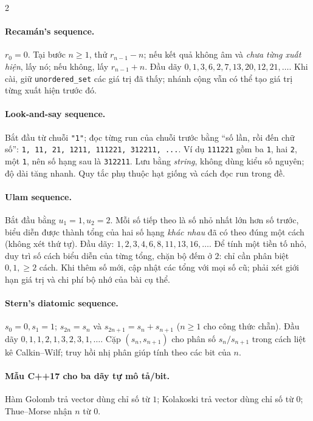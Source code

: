 \begin{multicols}{2}
\paragraph{Recamán's sequence.}
$r_0=0$. Tại bước $n\ge1$, thử $r_{n-1}-n$; nếu kết quả
không âm và \emph{chưa từng xuất hiện}, lấy nó; nếu không,
lấy $r_{n-1}+n$. Đầu dãy $0,1,3,6,2,7,13,20,12,21,\ldots$.
Khi cài, giữ \texttt{unordered\_set} các giá trị đã thấy;
nhánh cộng vẫn có thể tạo giá trị từng xuất hiện trước đó.

\paragraph{Look-and-say sequence.}
Bắt đầu từ chuỗi \texttt{"1"}; đọc từng run của chuỗi trước
bằng ``số lần, rồi đến chữ số'':
\texttt{1, 11, 21, 1211, 111221, 312211, ...}.
Ví dụ \texttt{111221} gồm ba \texttt{1}, hai \texttt{2}, một
\texttt{1}, nên số hạng sau là \texttt{312211}.
Lưu bằng \emph{string}, không dùng kiểu số nguyên; độ dài tăng
nhanh. Quy tắc phụ thuộc hạt giống và cách đọc run trong đề.

\paragraph{Ulam sequence.}
Bắt đầu bằng $u_1=1,u_2=2$. Mỗi số tiếp theo là số nhỏ nhất
lớn hơn số trước, biểu diễn được thành tổng của hai số hạng
\emph{khác nhau} đã có theo đúng một cách (không xét thứ tự).
Đầu dãy: $1,2,3,4,6,8,11,13,16,\ldots$.
Để tính một tiền tố nhỏ, duy trì số cách biểu diễn của từng tổng,
chặn bộ đếm ở $2$: chỉ cần phân biệt $0,1,\ge2$ cách.
Khi thêm số mới, cập nhật các tổng với mọi số cũ; phải xét
giới hạn giá trị và chi phí bộ nhớ của bài cụ thể.

\paragraph{Stern's diatomic sequence.}
$s_0=0,s_1=1$;
$s_{2n}=s_n$ và $s_{2n+1}=s_n+s_{n+1}$ ($n\ge1$ cho công thức chẵn).
Đầu dãy $0,1,1,2,1,3,2,3,1,\ldots$.
Cặp $(s_n,s_{n+1})$ cho phân số $s_n/s_{n+1}$ trong cách liệt kê
Calkin--Wilf; truy hồi nhị phân giúp tính theo các bit của $n$.

\paragraph{Mẫu C++17 cho ba dãy tự mô tả/bit.}
Hàm Golomb trả vector dùng chỉ số từ $1$; Kolakoski trả vector
dùng chỉ số từ $0$; Thue--Morse nhận $n$ từ $0$.


\end{multicols}

